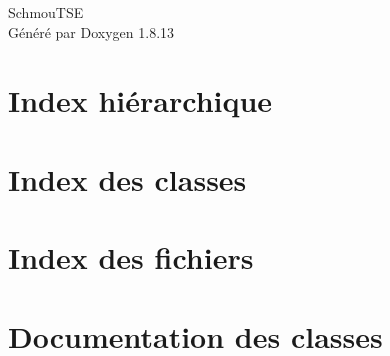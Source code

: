 \documentclass[twoside]{book}
\newcommand{\+}{\discretionary{\mbox{\scriptsize$\hookleftarrow$}}{}{}}
\newcommand{\clearemptydoublepage}{%
  \newpage{\pagestyle{empty}\cleardoublepage}%
}
\begin{document}
\hypersetup{pageanchor=false,
             bookmarksnumbered=true,
             pdfencoding=unicode
            }
\begin{titlepage}
\vspace*{7cm}
\begin{center}%
{\Large Schmou\textquotesingle{}T\+SE }\\
\vspace*{1cm}
{\large Généré par Doxygen 1.8.13}\\
\end{center}
\end{titlepage}
\clearemptydoublepage
{}
\tableofcontents
\clearemptydoublepage
{}
\hypersetup{pageanchor=true}

\chapter{Index hiérarchique}

\chapter{Index des classes}

\chapter{Index des fichiers}

\chapter{Documentation des classes}




















\end{document}
